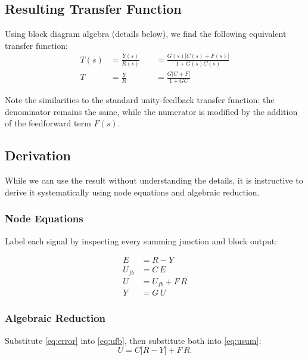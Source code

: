 \documentclass[11pt]{article}
\begin{document}
\subsection*{Resulting Transfer Function}

Using block diagram algebra (details below), we find the following equivalent transfer function:
\[
  \boxed{
    \begin{alignedat}{2}
      T(s) &= \frac{Y(s)}{R(s)} \; &&= \frac{G(s)\bigl[C(s)+F(s)\bigr]}{1+G(s)C(s)} \\[1ex]
      T    &= \frac{Y}{R}          &&= \frac{G\bigl[C+F\bigr]}{1+GC}
    \end{alignedat}
  }
\]

Note the similarities to the standard unity-feedback transfer function: the denominator remains the same, while the numerator is modified by the addition of the feedforward term $F(s)$.

\subsection*{Derivation}

While we can use the result without understanding the details, it is instructive to derive it systematically using node equations and algebraic reduction.

\subsubsection*{Node Equations}

Label each signal by inspecting every summing junction and block output:

\begin{align}
  E     &= R - Y                        \label{eq:error}      \\
  U_{fb}&= C\,E                         \label{eq:ufb}        \\
  U     &= U_{fb} + F\,R               \label{eq:usum}       \\
  Y     &= G\,U                         \label{eq:plant}
\end{align}

\subsubsection*{Algebraic Reduction}

Substitute \eqref{eq:error} into \eqref{eq:ufb}, then substitute both into
\eqref{eq:usum}:
\[
  U = C\bigl[R - Y\bigr] + F\,R.
\]
\end{document}
